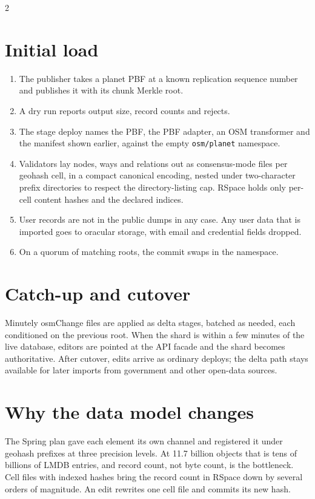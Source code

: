 \documentclass[10pt]{article}
\begin{document}
\begin{multicols}{2}

\section{Initial load}

\begin{enumerate}
\item The publisher takes a planet PBF at a known replication sequence number and
  publishes it with its chunk Merkle root.
\item A dry run reports output size, record counts and rejects.
\item The stage deploy names the PBF, the PBF adapter, an OSM transformer and the
  manifest shown earlier, against the empty \texttt{osm/planet} namespace.
\item Validators lay nodes, ways and relations out as consensus-mode files per
  geohash cell, in a compact canonical encoding, nested under two-character prefix
  directories to respect the directory-listing cap. RSpace holds only per-cell
  content hashes and the declared indices.
\item User records are not in the public dumps in any case. Any user data that is
  imported goes to oracular storage, with email and credential fields dropped.
\item On a quorum of matching roots, the commit swaps in the namespace.
\end{enumerate}

\section{Catch-up and cutover}

Minutely osmChange files are applied as delta stages, batched as needed, each
conditioned on the previous root. When the shard is within a few minutes of the
live database, editors are pointed at the API facade and the shard becomes
authoritative. After cutover, edits arrive as ordinary deploys; the delta path
stays available for later imports from government and other open-data sources.

\section{Why the data model changes}

The Spring plan gave each element its own channel and registered it under geohash
prefixes at three precision levels. At 11.7 billion objects that is tens of
billions of LMDB entries, and record count, not byte count, is the bottleneck.
Cell files with indexed hashes bring the record count in RSpace down by several
orders of magnitude. An edit rewrites one cell file and commits its new hash.


\end{multicols}
\end{document}
